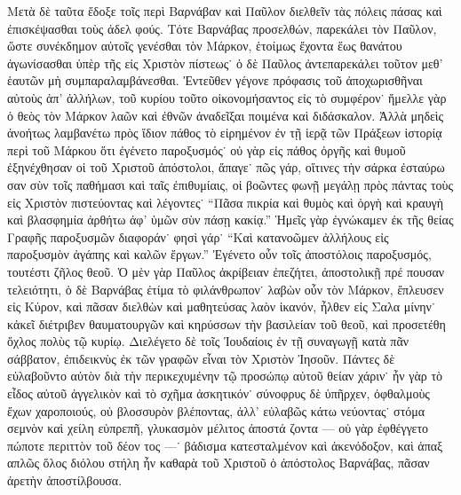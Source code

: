 Μετὰ δὲ ταῦτα ἔδοξε τοῖς περὶ Βαρνάβαν καὶ Παῦλον
διελθεῖν τὰς πόλεις πάσας καὶ ἐπισκέψασθαι τοὺς ἀδελ%
φούς. Τότε Βαρνάβας προσελθών, παρεκάλει τὸν Παῦλον,
ὥστε συνέκδημον αὐτοῖς γενέσθαι τὸν Μάρκον, ἑτοίμως
ἔχοντα ἕως θανάτου ἀγωνίσασθαι ὑπὲρ τῆς εἰς Χριστὸν
πίστεως˙ ὁ δὲ Παῦλος ἀντεπαρεκάλει τοῦτον μεθ’ ἑαυτῶν
μὴ συμπαραλαμβάνεσθαι. Ἐντεῦθεν γέγονε πρόφασις τοῦ
ἀποχωρισθῆναι αὐτοὺς ἀπ’ ἀλλήλων, τοῦ κυρίου τοῦτο
οἰκονομήσαντος εἰς τὸ συμφέρον˙ ἤμελλε γὰρ ὁ θεὸς
τὸν Μάρκον λαῶν καὶ ἐθνῶν ἀναδεῖξαι ποιμένα καὶ
διδάσκαλον. Ἀλλὰ μηδεὶς ἀνοήτως λαμβανέτω πρὸς ἴδιον
πάθος τὸ εἰρημένον ἐν τῇ ἱερᾷ τῶν Πράξεων ἱστορίᾳ
περὶ τοῦ Μάρκου ὅτι ἐγένετο παροξυσμός˙ οὐ γὰρ εἰς
πάθος ὀργῆς καὶ θυμοῦ ἐξηνέχθησαν οἱ τοῦ Χριστοῦ
ἀπόστολοι, ἄπαγε˙ πῶς γάρ, οἵτινες τὴν σάρκα ἐσταύρω%
σαν σὺν τοῖς παθήμασι καὶ ταῖς ἐπιθυμίαις, οἱ βοῶντες
φωνῇ μεγάλῃ πρὸς πάντας τοὺς εἰς Χριστὸν πιστεύοντας
καὶ λέγοντες˙ \enquote{Πᾶσα πικρία καὶ θυμὸς καὶ ὀργὴ καὶ
κραυγὴ καὶ βλασφημία ἀρθήτω ἀφ’ ὑμῶν σὺν πάσῃ κακίᾳ.}
Ἡμεῖς γὰρ ἐγνώκαμεν ἐκ τῆς θείας Γραφῆς παροξυσμῶν
διαφοράν˙ φησὶ γάρ˙ \enquote{Καὶ κατανοῶμεν ἀλλήλους εἰς
παροξυσμὸν ἀγάπης καὶ καλῶν ἔργων.} Ἐγένετο οὖν
τοῖς ἀποστόλοις παροξυσμός, τουτέστι ζῆλος θεοῦ. Ὁ
μὲν γὰρ Παῦλος ἀκρίβειαν ἐπεζήτει, ἀποστολικῇ πρέ%
πουσαν τελειότητι, ὁ δὲ Βαρνάβας ἐτίμα τὸ φιλάνθρωπον˙
λαβὼν οὖν τὸν Μάρκον, ἔπλευσεν εἰς Κύρον, καὶ πᾶσαν
διελθὼν καὶ μαθητεύσας λαὸν ἱκανόν, ἦλθεν εἰς Σαλα%
μίνην˙ κἀκεῖ διέτριβεν θαυματουργῶν καὶ κηρύσσων τὴν
βασιλείαν τοῦ θεοῦ, καὶ προσετέθη ὄχλος πολὺς τῷ
κυρίῳ. Διελέγετο δὲ τοῖς Ἰουδαίοις ἐν τῇ συναγωγῇ
κατὰ πᾶν σάββατον, ἐπιδεικνὺς ἐκ τῶν γραφῶν εἶναι
τὸν Χριστὸν Ἰησοῦν. Πάντες δὲ εὐλαβοῦντο αὐτὸν διὰ
τὴν περικεχυμένην τῷ προσώπῳ αὐτοῦ θείαν χάριν˙ ἦν
γὰρ τὸ εἶδος αὐτοῦ ἀγγελικὸν καὶ τὸ σχῆμα ἀσκητικόν˙
σύνοφρυς δὲ ὑπῆρχεν, ὀφθαλμοὺς ἔχων χαροποιούς, οὐ
βλοσσυρὸν βλέποντας, ἀλλ’ εὐλαβῶς κάτω νεύοντας˙ στόμα
σεμνὸν καὶ χείλη εὐπρεπῆ, γλυκασμὸν μέλιτος ἀποστά%
ζοντα --- οὐ γὰρ ἐφθέγγετο πώποτε περιττὸν τοῦ δέον%
τος ---˙ βάδισμα κατεσταλμένον καὶ ἀκενόδοξον, καὶ ἁπαξ%
απλῶς ὅλος διόλου στήλη ἦν καθαρὰ τοῦ Χριστοῦ ὁ
ἀπόστολος Βαρνάβας, πᾶσαν ἀρετὴν ἀποστίλβουσα.

